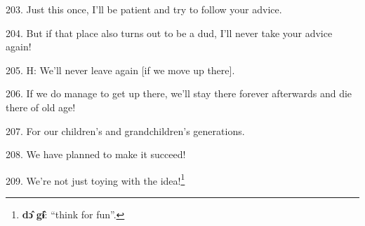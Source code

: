 203. Just this once, I'll be patient and try to follow your advice.

204. But if that place also turns out to be a dud, I'll never take your advice
again!

205. H: We'll never leave again [if we move up there].

206. If we do manage to get up there, we'll stay there forever afterwards and die
there of old age!

207. For our children's and grandchildren's generations.

208. We have planned to make it succeed!

209. We're not just toying with the idea!\footnote{\textbf{dɔ̂} \textbf{gɨ̂}: ``think for fun''.}

